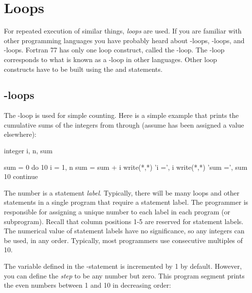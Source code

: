 \section{Loops}

For repeated execution of similar things, \textit{loops} are used. If
you are familiar with other programming languages you have probably
heard about -loops, -loops,
and -loops. Fortran 77 has only one loop
construct, called the -loop. The
-loop corresponds to what is known as a
-loop in other languages. Other loop constructs
have to be built using the  and
 statements.


\ifmini{\vspace{-7pt}}{}

\subsection*{-loops}

The -loop is used for simple counting. Here is a
simple example that prints the cumulative sums of the integers from
 through  (assume
 has been assigned a value elsewhere):

\begin{fortran77}
      integer i, n, sum

      sum = 0
      do 10 i = 1, n
         sum = sum + i
         write(*,*) 'i =', i
         write(*,*) 'sum =', sum
  10  continue
\end{fortran77}

The number  is a statement \textit{label}.
Typically, there will be many loops and other statements in a single
program that require a statement label. The programmer is responsible
for assigning a unique number to each label in each program (or
subprogram). Recall that column positions 1-5 are reserved for statement
labels. The numerical value of statement labels have no significance, so
any integers can be used, in any order. Typically, most programmers use
consecutive multiples of 10.

The variable defined in the -statement is
incremented by 1 by default. However, you can define the \textit{step}
to be any number but zero. This program segment prints the even numbers
between 1 and 10 in decreasing order:


